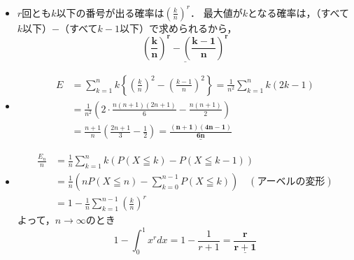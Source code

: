 \documentclass[a4paper,11pt]{ltjsarticle}
\begin{document}
\begin{ans}
\begin{itemize}
    \item [(1)]$r$回とも$k$以下の番号が出る確率は$\left(\frac{k}{n}\right)^r$．
    最大値が$k$となる確率は，（すべて$k$以下）$-$（すべて$k-1$以下）で求められるから，
    \[\underline{\boldsymbol{\left(\frac{k}{n}\right)^r-\left(\frac{k-1}{n}\right)^r}}\]
    \item [(2)]
    \begin{align*}
    E &= \sum_{k=1}^n k \left\{ \left(\frac{k}{n}\right)^2-\left(\frac{k-1}{n}\right)^2 \right\} = \frac{1}{n^2}\sum_{k=1}^n k(2k-1) \\
    &= \frac{1}{n^2}\left( 2\cdot\frac{n(n+1)(2n+1)}{6} - \frac{n(n+1)}{2} \right) \\
    &= \frac{n+1}{n}\left( \frac{2n+1}{3} - \frac{1}{2} \right) = \underline{\boldsymbol{\frac{(n+1)(4n-1)}{6n}}}
    \end{align*}
    \item [(3)]
    \begin{align*}
    \frac{E_n}{n} &= \frac{1}{n}\sum_{k=1}^n k \left( P(X\leqq k) - P(X\leqq k-1) \right) \\
    &= \frac{1}{n}\left( nP(X\leqq n) - \sum_{k=0}^{n-1} P(X\leqq k) \right) \quad (\text{アーベルの変形})\\
    &= 1 - \frac{1}{n}\sum_{k=1}^{n-1} \left(\frac{k}{n}\right)^r
    \end{align*}
    よって，$n\to\infty$のとき
    \[1 - \int_0^1 x^r dx = 1 - \frac{1}{r+1} = \underline{\boldsymbol{\frac{r}{r+1}}}\]
\end{itemize}
\end{ans}
\end{document}
